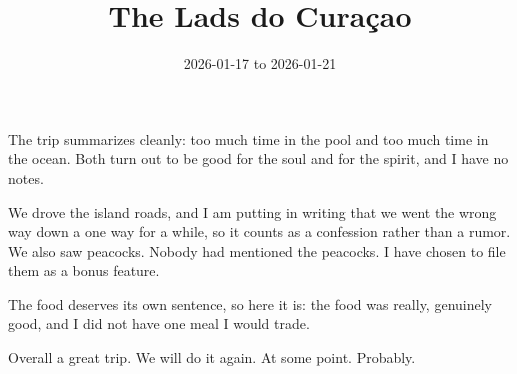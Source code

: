 
\title{The Lads do Curaçao}
\date{2026-01-17 to 2026-01-21}





The trip summarizes cleanly: too much time in the pool and too much time in the
ocean. Both turn out to be good for the soul and for the spirit, and I have no
notes.


We drove the island roads, and I am putting in writing that we went the wrong
way down a one way for a while, so it counts as a confession rather than a
rumor. We also saw peacocks. Nobody had mentioned the peacocks. I have chosen
to file them as a bonus feature.


The food deserves its own sentence, so here it is: the food was really,
genuinely good, and I did not have one meal I would trade.


Overall a great trip. We will do it again. At some point. Probably.


